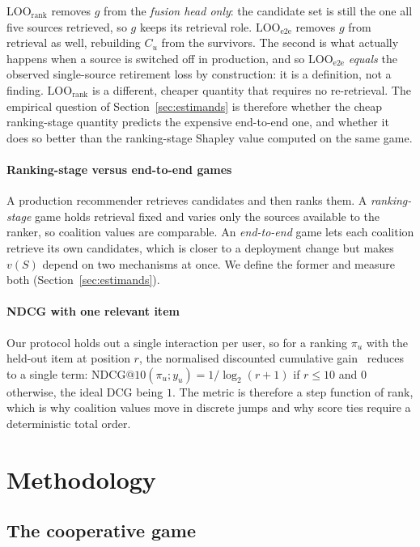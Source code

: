 \documentclass[pdflatex,sn-basic,Numbered]{sn-jnl}
\makeatletter
\theoremstyle{plain}
\theoremstyle{definition}
\newcommand{\Cu}{C_u}
\newcommand{\NDCG}{\mathrm{NDCG@10}}
\newcommand{\LOOr}{\mathrm{LOO}_{\mathrm{rank}}}
\newcommand{\LOOe}{\mathrm{LOO}_{\mathrm{e2e}}}
\makeatother
\begin{document}
$\LOOr$ removes $g$ from the \emph{fusion head only}: the candidate set is still
the one all five sources retrieved, so $g$ keeps its retrieval role. $\LOOe$
removes $g$ from retrieval as well, rebuilding $\Cu$ from the survivors. The
second is what actually happens when a source is switched off in production,
and so $\LOOe$ \emph{equals} the observed single-source retirement loss by construction: it is a definition, not a finding. $\LOOr$ is a different,
cheaper quantity that requires no re-retrieval. The empirical question of
Section~\ref{sec:estimands} is therefore whether the cheap ranking-stage
quantity predicts the expensive end-to-end one, and whether it does so better
than the ranking-stage Shapley value computed on the same game.

\paragraph{Ranking-stage versus end-to-end games}
A production recommender retrieves candidates and then ranks them. A
\emph{ranking-stage} game holds retrieval fixed and varies only the sources
available to the ranker, so coalition values are comparable. An
\emph{end-to-end} game lets each coalition retrieve its own candidates, which
is closer to a deployment change but makes $v(S)$ depend on two mechanisms at
once. We define the former and measure both
(Section~\ref{sec:estimands}).

\paragraph{NDCG with one relevant item}
Our protocol holds out a single interaction per user, so for a ranking
$\pi_u$ with the held-out item at position $r$, the normalised discounted
cumulative gain~\citep{jarvelin2002cumulated} reduces to a single term:
$\NDCG(\pi_u; y_u) = 1/\log_2(r+1)$ if $r \le 10$ and $0$ otherwise, the ideal
DCG being $1$. The metric is therefore a step function of rank, which is why
coalition values move in discrete jumps and why score ties require a
deterministic total order.

\section{Methodology}\label{sec:methodology}

\subsection{The cooperative game}\label{sec:game}
\end{document}
